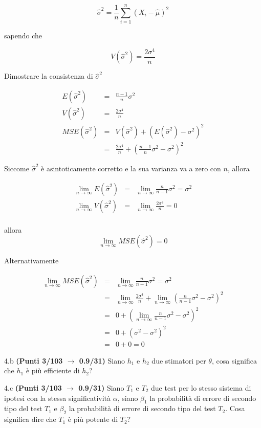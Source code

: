 \documentclass[
  11pt,
]{book}
\theoremstyle{mytheoremstyle}
\theoremstyle{mydefstyle}
\newenvironment{sol}
  {
  \begin{tcolorbox}[enhanced,breakable,arc=0.1mm,boxrule=1pt,colback=white,colframe=iblue,
  title=\bf \fontfamily{lmss}\selectfont \hspace{.5 cm} Soluzione,drop fuzzy shadow]

}{
\end{tcolorbox}
  }
\begin{document}
\[
  \hat\sigma^2 = \frac 1n \sum_{i=1}^n (X_i-\hat\mu)^2
\]

sapendo che

\[
V(\hat\sigma^2)= \frac{2\sigma^4}n
\]

Dimostrare la consistenza di \(\hat\sigma^2\)

\begin{sol}
\begin{eqnarray}
E(\hat\sigma^2)&=& \frac{n-1}{n}\sigma^2\\
V(\hat\sigma^2)&=& \frac{2\sigma^4}n\\
MSE(\hat\sigma^2) &=& V(\hat\sigma^2)+\left(E(\hat\sigma^2)-\sigma^2\right)^2\\
&=& \frac{2\sigma^4}n + \left(\frac{n-1}{n}\sigma^2-\sigma^2\right)^2
\end{eqnarray}

Siccome \(\hat\sigma^2\) è asintoticamente corretto e la sua varianza va a zero con \(n\), allora

\begin{eqnarray}
\lim_{n\to\infty} E(\hat\sigma^2) & =& \lim_{n\to\infty}\frac{n}{n-1}\sigma^2=\sigma^2\\
\lim_{n\to\infty} V(\hat\sigma^2) &=& \lim_{n\to\infty}\frac{2\sigma^4}n=0\\
\end{eqnarray}

allora
\[
\lim_{n\to\infty} MSE(\hat\sigma^2) = 0
\]

Alternativamente

\begin{eqnarray}
\lim_{n\to\infty} MSE(\hat\sigma^2) &=& \lim_{n\to\infty}\frac{n}{n-1}\sigma^2=\sigma^2\\
&=& \lim_{n\to\infty}\frac{2\sigma^4}n + \lim_{n\to\infty}\left(\frac{n}{n-1}\sigma^2-\sigma^2\right)^2\\
&=& 0 + \left(\lim_{n\to\infty}\frac{n}{n-1}\sigma^2-\sigma^2\right)^2\\
&=& 0 + \left(\sigma^2-\sigma^2\right)^2\\
&=& 0 + 0 = 0
\end{eqnarray}

\end{sol}

4.b \textbf{(Punti 3/103 \(\rightarrow\) 0.9/31)} Siano \(h_1\) e \(h_2\) due stimatori per \(\theta\), cosa significa che \(h_1\) è più efficiente di \(h_2\)?

4.c \textbf{(Punti 3/103 \(\rightarrow\) 0.9/31)} Siano \(T_1\) e \(T_2\) due test per lo stesso sistema di ipotesi con la stessa significatività \(\alpha\), siano \(\beta_1\) la probabilità di errore di secondo tipo del test \(T_1\) e \(\beta_2\) la probabilità di errore di secondo tipo del test \(T_2\). Cosa significa dire che \(T_1\) è più potente di \(T_2\)?
\end{document}
